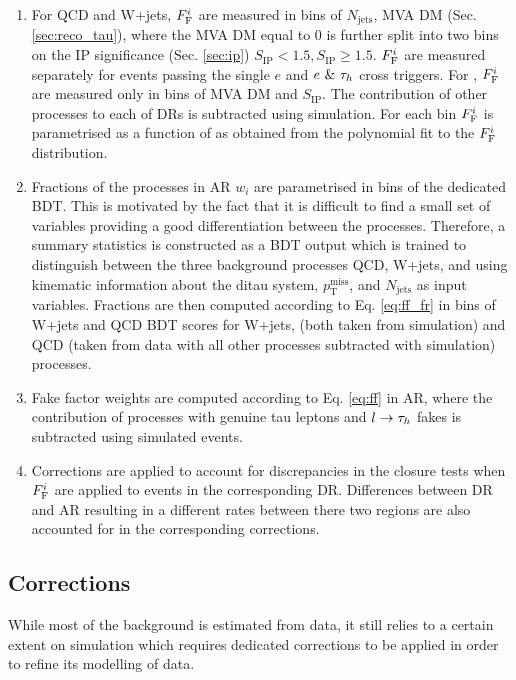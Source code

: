 \begin{enumerate}
    \item For QCD and W+jets, $F_\text{F}^i$ are measured in bins of $N_\text{jets}$, MVA DM (Sec. \ref{sec:reco_tau}), where the MVA DM equal to 0 is further split into two bins on the IP significance (Sec. \ref{sec:ip}) $S_{\text{IP}} < 1.5, S_{\text{IP}} \geq 1.5$. $F_\text{F}^i$ are measured separately for events passing the single $e$ and $e~\&~\tau_h$ cross triggers. For \ttbar, $F_\text{F}^i$ are measured only in bins of MVA DM and $S_{\text{IP}}$. The contribution of other processes to each of DRs is subtracted using simulation. For each bin $F_\text{F}^i$ is parametrised as a function of \tauh \pt as obtained from the polynomial fit to the $F_\text{F}^i$ distribution. 
    
    \item Fractions of the processes in AR $w_i$ are parametrised in bins of the dedicated BDT. This is motivated by the fact that it is difficult to find a small set of variables providing a good differentiation between the \jtt processes. Therefore, a summary statistics is constructed as a BDT output which is trained to distinguish between the three background processes QCD, W+jets, and \ttbar using kinematic information about the ditau system, $p_\text{T}^\text{miss}$, and $N_\text{jets}$  as input variables. Fractions are then computed according to Eq. \ref{eq:ff_fr} in bins of W+jets and QCD BDT scores for W+jets, \ttbar (both taken from simulation) and QCD (taken from data with all other processes subtracted with simulation) processes.
    
    \item Fake factor weights are computed according to Eq. \ref{eq:ff} in AR, where the contribution of processes with genuine tau leptons and $l\to\tau_h$ fakes is subtracted using simulated events.
    
    \item Corrections are applied to account for discrepancies in the closure tests when $F_\text{F}^i$ are applied to events in the corresponding DR. Differences between DR and AR resulting in a different \jtt rates between there two regions are also accounted for in the corresponding corrections. 
\end{enumerate}

\subsection{Corrections}
While most of the background is estimated from data, it still relies to a certain extent on simulation which requires dedicated corrections to be applied in order to refine its modelling of data. 

